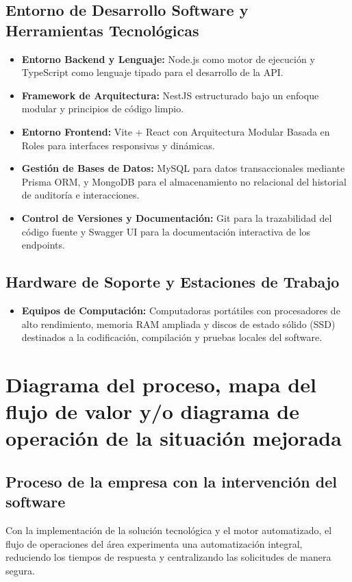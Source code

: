 \subsection{Entorno de Desarrollo Software y Herramientas Tecnológicas}
\begin{itemize}
\item \textbf{Entorno Backend y Lenguaje:} Node.js como motor de ejecución y TypeScript como lenguaje tipado para el desarrollo de la API.
\item \textbf{Framework de Arquitectura:} NestJS estructurado bajo un enfoque modular y principios de código limpio.
\item \textbf{Entorno Frontend:} Vite + React con Arquitectura Modular Basada en Roles para interfaces responsivas y dinámicas.
\item \textbf{Gestión de Bases de Datos:} MySQL para datos transaccionales mediante Prisma ORM, y MongoDB para el almacenamiento no relacional del historial de auditoría e interacciones.
\item \textbf{Control de Versiones y Documentación:} Git para la trazabilidad del código fuente y Swagger UI para la documentación interactiva de los endpoints.
\end{itemize}

\subsection{Hardware de Soporte y Estaciones de Trabajo}
\begin{itemize}
\item \textbf{Equipos de Computación:} Computadoras portátiles con procesadores de alto rendimiento, memoria RAM ampliada y discos de estado sólido (SSD) destinados a la codificación, compilación y pruebas locales del software.
\end{itemize}

\section{Diagrama del proceso, mapa del flujo de valor y/o diagrama de operación de la situación mejorada}
\subsection{Proceso de la empresa con la intervención del software}
Con la implementación de la solución tecnológica y el motor automatizado, el flujo de operaciones del área experimenta una automatización integral, reduciendo los tiempos de respuesta y centralizando las solicitudes de manera segura.


